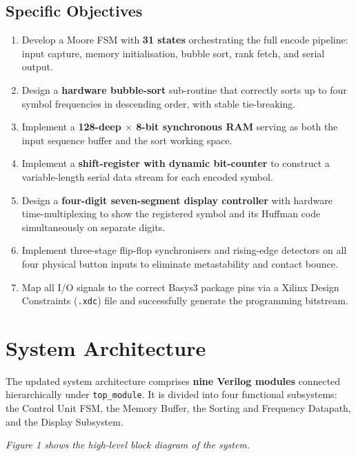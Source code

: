 \documentclass[12pt,a4paper]{article}
\begin{document}
\subsection{Specific Objectives}
\begin{enumerate}
  \item Develop a Moore FSM with \textbf{31 states} orchestrating the full encode pipeline:
        input capture, memory initialisation, bubble sort, rank fetch, and serial output.
  \item Design a \textbf{hardware bubble-sort} sub-routine that correctly sorts up to four
        symbol frequencies in descending order, with stable tie-breaking.
  \item Implement a \textbf{128-deep $\times$ 8-bit synchronous RAM} serving as both the
        input sequence buffer and the sort working space.
  \item Implement a \textbf{shift-register with dynamic bit-counter} to construct a
        variable-length serial data stream for each encoded symbol.
  \item Design a \textbf{four-digit seven-segment display controller} with hardware
        time-multiplexing to show the registered symbol and its Huffman code
        simultaneously on separate digits.
  \item Implement three-stage flip-flop synchronisers and rising-edge detectors on all
        four physical button inputs to eliminate metastability and contact bounce.
  \item Map all I/O signals to the correct Basys3 package pins via a Xilinx Design
        Constraints (\texttt{.xdc}) file and successfully generate the programming
        bitstream.
\end{enumerate}

\section{System Architecture}

The updated system architecture comprises \textbf{nine Verilog modules} connected
hierarchically under \texttt{top\_module}. It is divided into four functional
subsystems: the Control Unit FSM, the Memory Buffer, the Sorting and Frequency
Datapath, and the Display Subsystem.

\vspace{0.5cm}
\noindent\textit{Figure 1 shows the high-level block diagram of the system.}
\vspace{0.3cm}
\end{document}
